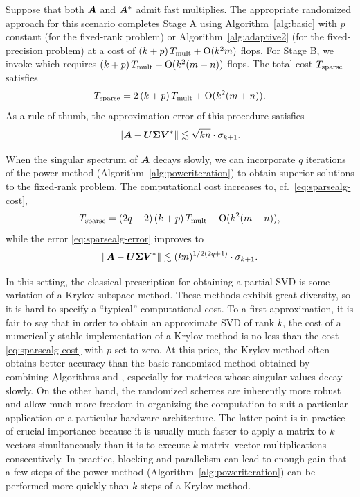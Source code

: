 \documentclass{article}
\begin{document}
Suppose that both $\bm{A}$ and $\bm{A}^*$ admit fast multiplies.
The appropriate randomized approach for this scenario completes
Stage A using Algorithm~\ref{alg:basic} with $p$ constant
(for the fixed-rank problem)
or Algorithm~\ref{alg:adaptive2} (for the fixed-precision problem)
at a cost of  $(k+p) \, T_{\rm mult} + \mathrm{O}(k^2 m)$ flops.
For Stage B, we invoke \cite[Algorithm 5.1]{RM} %
which
requires $(k+p) \, T_{\rm mult} + \mathrm{O}(k^2 (m + n))$ flops.
The total cost $T_{\rm sparse}$ satisfies
\begin{equation}
\label{eq:sparsealg-cost}
T_{\rm sparse} = 2\,(k + p)\, T_{\rm mult} + \mathrm{O}(k^2 (m + n)).
\end{equation}
As a rule of thumb, the approximation error of this procedure satisfies
\begin{equation}
\label{eq:sparsealg-error}
\left\Vert { \bm{A} - \bm{U\Sigma V}^*} \right\Vert \lesssim \sqrt{kn} \cdot \sigma_{k+1}.
\end{equation}


When the singular spectrum of $\bm{A}$ decays slowly,
we can incorporate $q$ iterations of the power method
(Algorithm~\ref{alg:poweriteration}) to obtain superior
solutions to the fixed-rank problem.
The computational cost increases to, cf.~\eqref{eq:sparsealg-cost},
\begin{equation}
\label{eq:sparsealg-cost2}
T_{\rm sparse} = (2q+2)\,(k + p) \, T_{\rm mult} + \mathrm{O}(k^2 (m + n)),
\end{equation}
while the error \eqref{eq:sparsealg-error} improves to
\begin{equation}
\label{eq:sparsealg-error2}
\left\Vert { \bm{A} - \bm{U\Sigma V}^*} \right\Vert \lesssim (kn)^{1/2(2q+1)} \cdot \sigma_{k+1}.
\end{equation}


In this setting, the classical prescription for obtaining a partial SVD
is some variation of a Krylov-subspace method.
These methods exhibit great diversity, so it is hard to specify
a ``typical'' computational cost.
To a first approximation, it is fair to say
that in order to obtain an approximate SVD of rank $k$, the cost of
a numerically stable implementation of a Krylov method is no less than
the cost \eqref{eq:sparsealg-cost} with $p$ set to zero. At this price,
the Krylov method often obtains better accuracy than the basic
randomized method obtained by combining Algorithms \cite[Algorithm 4.1]{RM} and
\cite[Algorithm 5.1]{RM}, especially for matrices whose singular values decay
slowly. On the other hand, the randomized schemes are inherently more robust
and allow much more freedom in organizing the computation to suit a particular
application or a particular hardware architecture. The latter point is in
practice of crucial importance because it is usually much faster to apply a
matrix to $k$ vectors simultaneously than it is to execute $k$ matrix--vector
multiplications consecutively.  In practice, blocking and parallelism can lead
to enough gain that a few steps of the power method (Algorithm~\ref{alg:poweriteration})
can be performed more quickly than $k$ steps of a Krylov method.
\end{document}
